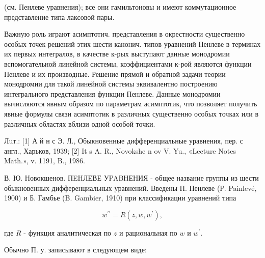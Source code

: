 \documentclass[10pt]{article}
\begin{document}
(см. Пенлеве уравнения); все они гамильтоновы и имеют коммутационное представление типа лаксовой пары.



Важную роль играют асимптотич. представления в окрестности существенно особых точек решений этих шести канонич. типов уравнений Пенлеве в терминах их первых интегралов, в качестве к-рых выступают данные монодромии вспомогательной линейной системы, коэффициентами к-рой являются функции Пенлеве и их производные. Решение прямой и обратной задачи теории монодромии для такой линейной системы эквивалентно построению интегрального представления функции Пенлеве. Данные монодромии вычисляются явным образом по параметрам асимптотик, что позволяет получить явные формулы связи асимптотик в различных существенно особых точках или в различных областях вблизи одной особой точки.



Лuт.: [1] А й н с Э. Л., Обыкновенные дифференциальные уравнения, пер. с англ., Харьков, 1939; [2] It s A. R., Novokshe n ov V. Yu., «Lecture Notes Math.», v. 1191, B., 1986.



В. Ю. Новокшенов. ПEHЛЕВЕ УPABНЕНИЯ - общее название группы из шести обыкновенных дифференциальных уравнений. Введены П. Пенлеве (P. Painlevé, 1900) и Б. Гамбье (B. Gambier, 1910) при классификации уравнений типа



\[

w^{\prime \prime}=R\left(z, w, w^{\prime}\right),

\]



где $R$ - функция аналитическая по $z$ и рациональная по $w$ и $w^{\prime}$.



Обычно П. у. записывают в следующем виде:
\end{document}
